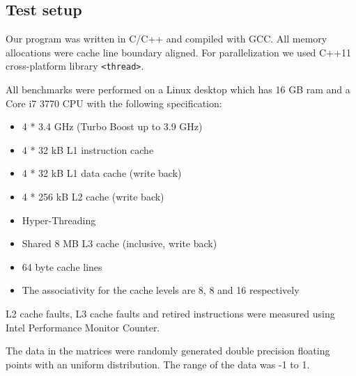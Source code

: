 \subsection{Test setup}

Our program was written in C/C++ and compiled with GCC. All memory allocations were cache line boundary aligned. For parallelization we used C++11 cross-platform library \texttt{<thread>}.

All benchmarks were performed on a Linux desktop which has 16 GB ram and a Core i7 3770 CPU with the following specification:

\begin{itemize}
\item 4 * 3.4 GHz (Turbo Boost up to 3.9 GHz)
\item 4 * 32 kB L1 instruction cache
\item 4 * 32 kB L1 data cache (write back)
\item 4 * 256 kB L2 cache (write back)
\item Hyper-Threading
\item Shared 8 MB L3 cache (inclusive, write back)
\item 64 byte cache lines
\item The associativity for the cache levels are 8, 8 and 16 respectively
\end{itemize}

L2 cache faults, L3 cache faults and retired instructions were measured using Intel Performance Monitor Counter.

The data in the matrices were randomly generated double precision floating points with
an uniform distribution. The range of the data was -1 to
1.